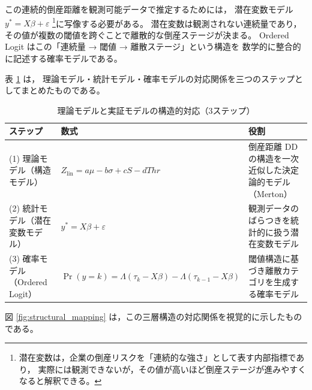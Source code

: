この連続的倒産距離を観測可能データで推定するためには，
潜在変数モデル $y^* = X\beta + \varepsilon$ \footnote{
潜在変数は，企業の倒産リスクを「連続的な強さ」として表す内部指標であり，
実際には観測できないが，その値が高いほど倒産ステージが進みやすくなると解釈できる。
}に写像する必要がある。
潜在変数は観測されない連続量であり，
その値が複数の閾値を跨ぐことで離散的な倒産ステージが決まる。
Ordered Logit はこの「連続量 → 閾値 → 離散ステージ」という構造を
数学的に整合的に記述する確率モデルである。

表 \ref{tab:theory_empirical_mapping} は，
理論モデル・統計モデル・確率モデルの対応関係を三つのステップとしてまとめたものである。

\begin{table}[H]
\centering
\caption{理論モデルと実証モデルの構造的対応（3ステップ）}
\label{tab:theory_empirical_mapping}
\begin{tabular}{p{3cm} p{6cm} p{6cm}}
\toprule
ステップ & 数式 & 役割 \\
\midrule
(1) 理論モデル（構造モデル） &
\(\displaystyle Z_{\text{lin}} = a\mu - b\sigma + cS - dThr\) &
倒産距離 DD の構造を一次近似した決定論的モデル（Merton） \\

(2) 統計モデル（潜在変数モデル） &
\(\displaystyle y^* = X\beta + \varepsilon\) &
観測データのばらつきを統計的に扱う潜在変数モデル \\

(3) 確率モデル（Ordered Logit） &
\(\displaystyle \Pr(y=k)=\Lambda(\tau_k - X\beta)-\Lambda(\tau_{k-1}-X\beta)\) &
閾値構造に基づき離散カテゴリを生成する確率モデル \\
\bottomrule
\end{tabular}
\end{table}

図 \ref{fig:structural_mapping} は，この三層構造の対応関係を視覚的に示したものである。

